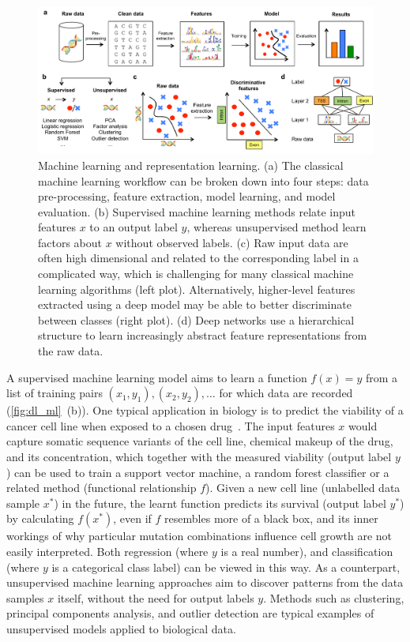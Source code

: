 \begin{figure}[htbp!]
\centering
\includegraphics[width=1.0\textwidth]{ml}
\caption[Machine learning and representation learning.]{Machine learning and representation learning. (a) The classical machine learning workflow can be broken down into four steps: data pre-processing, feature extraction, model learning, and model evaluation. (b) Supervised machine learning methods relate input features $x$ to an output label $y$, whereas unsupervised method learn factors about $x$ without observed labels. (c) Raw input data are often high dimensional and related to the corresponding label in a complicated way, which is challenging for many classical machine learning algorithms (left plot). Alternatively, higher-level features extracted using a deep model may be able to better discriminate between classes (right plot). (d) Deep networks use a hierarchical structure to learn increasingly abstract feature representations from the raw data.}
\label{fig:dl_ml}
\end{figure}

A supervised machine learning model aims to learn a function $f(x)=y$ from a list of training pairs $(x_1,y_1), (x_2,y_2),\ldots$ for which data are recorded (\autoref{fig:dl_ml}~(b)). One typical application in biology is to predict the viability of a cancer cell line when exposed to a chosen drug~\citep{eduati_prediction_2015,menden_machine_2013}. The input features $x$ would capture somatic sequence variants of the cell line, chemical makeup of the drug, and its concentration, which together with the measured viability (output label $y$) can be used to train a support vector machine, a random forest classifier or a related method (functional relationship $f$). Given a new cell line (unlabelled data sample $x^*$) in the future, the learnt function predicts its survival (output label $y^*$) by calculating $f(x^*)$, even if $f$ resembles more of a black box, and its inner workings of why particular mutation combinations influence cell growth are not easily interpreted. Both regression (where $y$ is a real number), and classification (where $y$ is a categorical class label) can be viewed in this way. As a counterpart, unsupervised machine learning approaches aim to discover patterns from the data samples $x$ itself, without the need for output labels $y$. Methods such as clustering, principal components analysis, and outlier detection are typical examples of unsupervised models applied to biological data.

